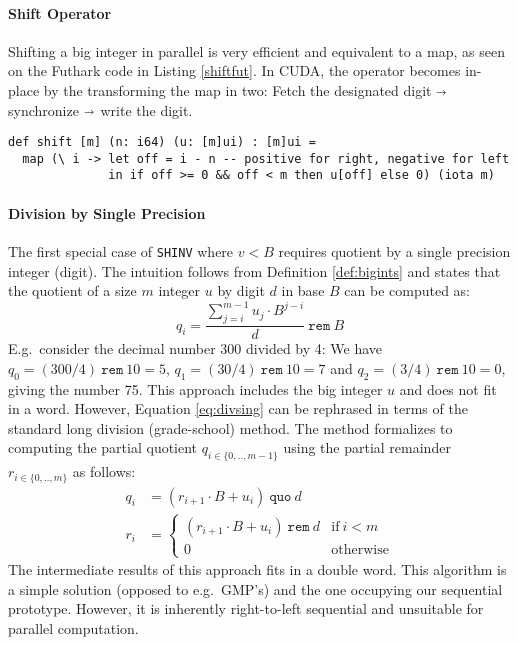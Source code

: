 \paragraph{Shift Operator}
Shifting a big integer in parallel is very efficient and equivalent to a map, as
seen on the Futhark code in Listing \ref{shiftfut}. In CUDA, the operator
becomes in-place by the transforming the map in two: Fetch the designated digit
$\shortrightarrow$ synchronize $\shortrightarrow$ write the digit.
\begin{lstlisting}[language=futhark,caption={\footnotesize Shift operator (Definition \ref{def:shifts}) in Futhark from file \texttt{helper.fut}.},firstnumber=96,label={shiftfut}]
def shift [m] (n: i64) (u: [m]ui) : [m]ui =
  map (\ i -> let off = i - n -- positive for right, negative for left
              in if off >= 0 && off < m then u[off] else 0) (iota m)
\end{lstlisting}

\paragraph{Division by Single Precision}
The first special case of \texttt{SHINV} where $v<B$ requires quotient by a
single precision integer (digit). The intuition follows from Definition
\ref{def:bigints} and states that the quotient of a size $m$ integer $u$ by
digit $d$ in base $B$ can be computed as:
\begin{equation}
  \label{eq:divsing}
  q_i = \dfrac{\sum_{j=i}^{m-1} u_j \cdot B^{j-i}}{d}~ \mathtt{rem}~ B
\end{equation}
E.g.\ consider the decimal number 300 divided by 4: We have
$q_0 = (300 / 4)~ \mathtt{rem}~ 10 = 5$, $q_1 = (30 / 4)~ \mathtt{rem}~ 10 = 7$
and $q_2 = (3 / 4)~\mathtt{rem}~10 = 0$, giving the number 75. This approach
includes the big integer $u$ and does not fit in a word. However, Equation
\ref{eq:divsing} can be rephrased in terms of the standard long division
(grade-school) method. The method formalizes to computing the partial quotient
$q_{i\in\{0,..,m-1\}}$ using the partial remainder $r_{i\in\{0,..,m\}}$ as follows:
\begin{align}
  q_i &= \left( r_{i+1} \cdot B + u_i\right)~ \mathtt{quo}~ d\\
  r_i &= \begin{cases} \left( r_{i+1} \cdot B + u_i\right)~ \mathtt{rem}~d & \text{if}~i<m \\ 0 & \text{otherwise} \end{cases}
\end{align}
The intermediate results of this approach fits in a double word. This algorithm
is a simple solution (opposed to e.g.\ GMP's) and the one occupying our
sequential prototype. However, it is inherently right-to-left
sequential and unsuitable for parallel computation.

